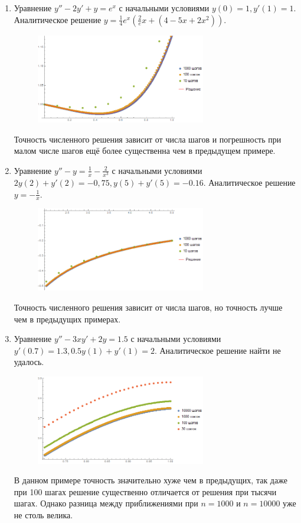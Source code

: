 \documentclass[a4paper,12pt,titlepage,finall]{article}
\begin{document}
\begin{enumerate}
\item
Уравнение $y'' - 2y' + y = e^x$ с начальными условиями $y(0) = 1, y'(1) = 1$. Аналитическое решение $y = \frac{1}{4} e^{x} (\frac{2}{e} x + (4 - 5 x + 2 x^2))$.
\begin{figure}[h]
\centering
\includegraphics[width=0.7\textwidth]{test_2_2.png}
\end{figure}
\par
Точность численного решения зависит от числа шагов и погрешность при малом числе шагов ещё более существенна чем в предыдущем примере.
\newpage
\item
Уравнение $y'' - y = \frac{1}{x} - \frac{2}{x^3}$ с начальными условиями $2y(2) + y'(2) = -0,75, y(5) + y'(5) = -0.16$. Аналитическое решение $y = -\frac{1}{x}$.
\begin{figure}[h]
\centering
\includegraphics[width=0.7\textwidth]{test_2_3.png}
\end{figure}
\par
Точность численного решения зависит от числа шагов, но точность лучше чем в предыдущих примерах.

\item
Уравнение $y'' -3xy' + 2y = 1.5$ с начальными условиями $y'(0.7) = 1.3, 0.5 y(1) + y'(1) = 2$. Аналитическое решение найти не удалось.
\begin{figure}[h]
\centering
\includegraphics[width=0.7\textwidth]{test_2_4.png}
\end{figure}
\par
В данном примере точность значительно хуже чем в предыдущих, так даже при 100 шагах решение существенно отличается от решения при тысячи шагах. Однако разница между приближениями при $n = 1000$ и $n = 10000$ уже не столь велика.
\end{enumerate}
\end{document}
